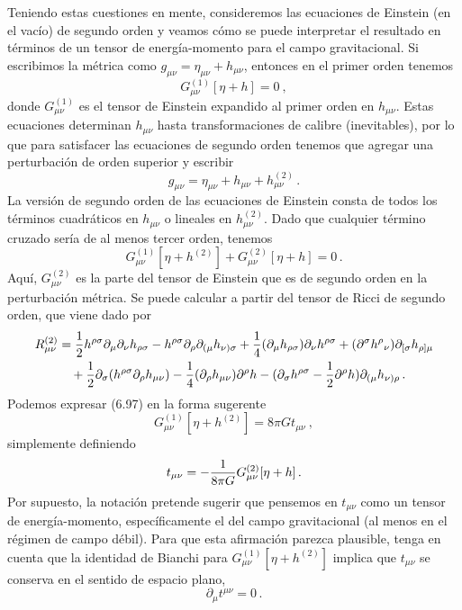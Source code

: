 \documentclass[11pt,b5paper,openany,twoside]{book}
\newcommand{\mn}{{\mu\nu}}
\newcommand{\p}[1]{{\partial_{#1}}}
\begin{document}
Teniendo estas cuestiones en mente, consideremos las ecuaciones de Einstein (en el vacío) de segundo orden y veamos cómo se puede interpretar el resultado en términos de un tensor de energía-momento para el campo gravitacional.
Si escribimos la métrica como $g_\mn = \eta_\mn + h_\mn$, entonces en el primer orden tenemos
\begin{equation}
G^{(1)}_\mn[\eta+h] = 0\ ,\label{6.95}
\end{equation}
donde $G^{(1)}_\mn$ es el tensor de Einstein expandido al primer orden en $h_\mn$.
Estas ecuaciones determinan $h_\mn$ hasta transformaciones de calibre (inevitables), por lo que para satisfacer las ecuaciones de segundo orden tenemos que agregar una perturbación de orden superior y escribir
\begin{equation}
g_\mn = \eta_\mn + h_\mn + h^{(2)}_\mn\,.\label{6.96}
\end{equation}
La versión de segundo orden de las ecuaciones de Einstein consta de todos los términos cuadráticos en $h_\mn$ o lineales en $h^{(2)}_\mn$.
Dado que cualquier término cruzado sería de al menos tercer orden, tenemos
\begin{equation}
G^{(1)}_\mn[\eta+h^{(2)}] +G^{(2)}_\mn[\eta+h] =0\,.
\label{6.97}
\end{equation}
Aquí, $G^{(2)}_\mn$ es la parte del tensor de Einstein que es de segundo orden en la perturbación métrica.
Se puede calcular a partir del tensor de Ricci de segundo orden, que viene dado por
\begin{align}
R^{(2)}_\mn  &=  {1\over 2}h^{\rho\sigma}\p\mu
\p\nu h_{\rho\sigma} - h^{\rho\sigma}\p\rho\p{(\mu}
h_{\nu)\sigma} +{1\over 4}(\p\mu h_{\rho\sigma})\p\nu
h^{\rho\sigma} +(\partial^\sigma h^\rho{}_\nu)
\p{[\sigma}h_{\rho]\mu}  \notag \\
&\quad +{1\over 2}\p\sigma(h^{\rho\sigma}\p\rho h_\mn)
-{1\over 4}(\p\rho h_\mn)\partial^\rho h - (\p\sigma
h^{\rho\sigma} -{1\over 2}\partial^\rho h)\p{(\mu}
h_{\nu)\rho}\,. \label{6.98}
\end{align}
Podemos expresar (6.97) en la forma sugerente
\begin{equation}
G^{(1)}_\mn[\eta+h^{(2)}] = 8\pi G t_\mn \ ,\label{6.99}
\end{equation}
simplemente definiendo
\begin{equation}
t_\mn = -{1\over {8\pi G}}G^{(2)}_\mn[\eta+h]\,.\label{6.100}
\end{equation}
Por supuesto, la notación pretende sugerir que pensemos en $t_\mn$ como un tensor de energía-momento, específicamente el del campo gravitacional (al menos en el régimen de campo débil).
Para que esta afirmación parezca plausible, tenga en cuenta que la identidad de Bianchi para $G^{(1)}_\mn[\eta+h^{(2)}]$ implica que $t_\mn$ se conserva en el sentido de espacio plano,
\begin{equation}
\p\mu t^\mn =0\,.\label{6.101}
\end{equation}
\end{document}
